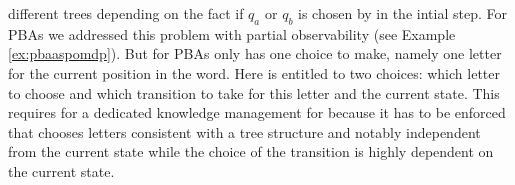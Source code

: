 \begin{example}
  different trees depending on the fact if $q_{a}$ or $q_{b}$ is chosen by 
  \adam{} in the intial step. For \acp{PBA} we addressed this problem 
  with partial observability (see Example \ref{ex:pbaaspomdp}). But for 
  \acp{PBA} \eve{} only has one choice to make, namely one letter for the 
  current position in the word. Here \eve{} is entitled to two choices: which
  letter to choose and which transition to take for this letter and the current
  state. This requires for a dedicated knowledge management for \eve{} because
  it has to be enforced that \eve{} chooses letters consistent with a tree 
  structure and notably independent from the current state while the choice
  of the transition is highly dependent on the current state.
  \label{ex:alternatingtreeemptiness}
\end{example}
